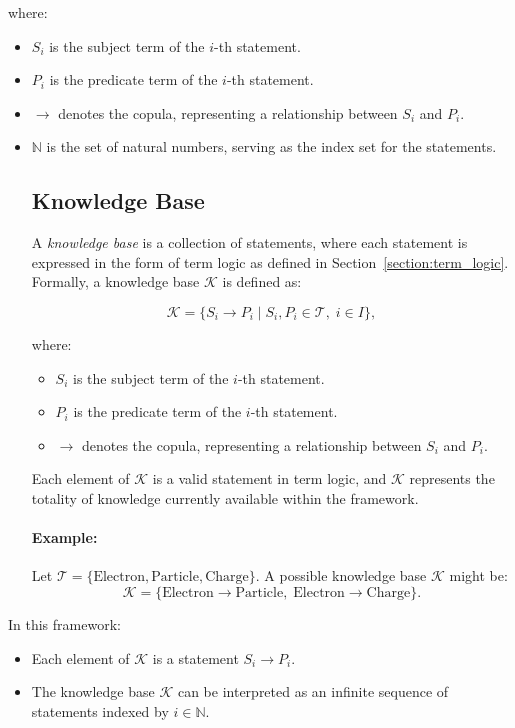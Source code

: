 \documentclass{article}
\begin{document}
where:
\begin{itemize}
    \item $S_i$ is the subject term of the $i$-th statement.
    \item $P_i$ is the predicate term of the $i$-th statement.
    \item $\to$ denotes the copula, representing a relationship between $S_i$ and $P_i$.
    \item $\mathbb{N}$ is the set of natural numbers, serving as the index set for the statements.\subsection{Knowledge Base}

A \emph{knowledge base} is a collection of statements, where each statement is expressed in the form of term logic as defined in Section~\ref{section:term_logic}. Formally, a knowledge base $\mathcal{K}$ is defined as:

$$
\mathcal{K} = \{ S_i \to P_i \mid S_i, P_i \in \mathcal{T}, \; i \in I \},
$$

where:
\begin{itemize}
    \item $S_i$ is the subject term of the $i$-th statement.
    \item $P_i$ is the predicate term of the $i$-th statement.
    \item $\to$ denotes the copula, representing a relationship between $S_i$ and $P_i$.
\end{itemize}


Each element of $\mathcal{K}$ is a valid statement in term logic, and $\mathcal{K}$ represents the totality of knowledge currently available within the framework.

\paragraph{Example:}
Let $\mathcal{T} = \{\text{Electron}, \text{Particle}, \text{Charge}\}$. A possible knowledge base $\mathcal{K}$ might be:
$$
\mathcal{K} = \{\text{Electron} \to \text{Particle}, \; \text{Electron} \to \text{Charge} \}.
$$

\end{itemize}

In this framework:
\begin{itemize}
    \item Each element of $\mathcal{K}$ is a statement $S_i \to P_i$.
    \item The knowledge base $\mathcal{K}$ can be interpreted as an infinite sequence of statements indexed by $i \in \mathbb{N}$.
\end{itemize}
\end{document}
